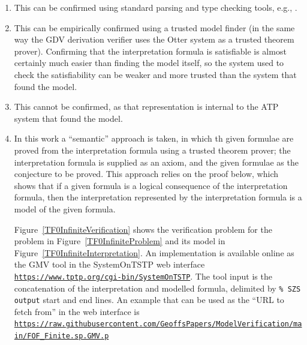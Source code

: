 \documentclass[letterpaper]{article}
\newcommand{\smalltt}[1]{\small \texttt{#1}}
\begin{document}
\begin{enumerate}
\item This can be confirmed using standard parsing and type checking tools, e.g., \cite{VS06,HR15}.
\item This can be empirically confirmed using a trusted model finder (in the same way the GDV 
      derivation verifier \cite{Sut06} uses the Otter system \cite{McC03-Otter} as a trusted 
      theorem prover).
      Confirming that the interpretation formula is satisfiable is almost certainly much 
      easier than finding the model itself, so the system used to check the satisfiability can 
      be weaker and more trusted than the system that found the model.
\item This cannot be confirmed, as that representation is internal to the ATP system that found
      the model.
\item In this work a ``semantic'' approach is taken, in which th given formulae are proved from
      the interpretation formula using a trusted theorem prover; the interpretation formula is 
      supplied as an axiom, and the given formulae as the conjecture to be proved.
      This approach relies on the proof below, which shows that if a given formula is a logical 
      consequence of the interpretation formula, then the interpretation represented by the
      interpretation formula is a model of the given formula.

      Figure~\ref{TF0InfiniteVerification} shows the verification problem for the problem in 
      Figure~\ref{TF0InfiniteProblem} and its model in Figure~\ref{TF0InfiniteInterpretation}.
      An implementation is available online as the GMV tool in the SystemOnTSTP \cite{Sut07-CSR} 
      web interface {\smalltt{\url{https://www.tptp.org/cgi-bin/SystemOnTSTP}}}.
      The tool input is the concatenation of the interpretation and modelled formula,
      delimited by {\smalltt{\% SZS output}} start and end lines.
      An example that can be used as the ``URL to fetch from'' in the web interface is 
      {\smalltt{\url{https://raw.githubusercontent.com/GeoffsPapers/ModelVerification/main/FOF_Finite.sp.GMV.p}}}
\end{enumerate}
\end{document}
